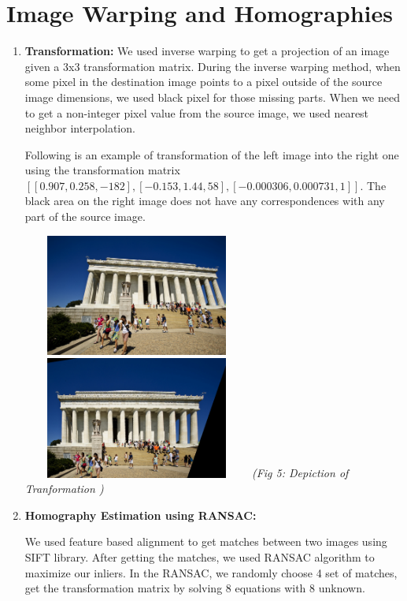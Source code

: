 \documentclass{article}
\begin{document}
			\part{ Image Warping and Homographies}	
			\begin{enumerate}
				\item  \textbf{Transformation:}
						We used inverse warping to get a projection of an image given a 3x3 transformation matrix. During the inverse warping method, when some pixel in the destination image points to a pixel outside of the source image dimensions, we used black pixel for those missing parts. When we need to get a non-integer pixel value from the source image, we used nearest neighbor interpolation. 
						
						Following is an example of transformation of the left image into the right one using the transformation matrix $[[0.907,0.258,-182],[-0.153,1.44,58],[-0.000306,0.000731,1]]$. The black area on the right image does not have any correspondences with any part of the source image.
						
								\begin{center}
									\includegraphics[height=4cm,width=7.5cm]{21} \includegraphics[height=4cm,width=7.5cm]{212} 
									\textit{	(Fig 5: Depiction of Tranformation )}
								\end{center}
								
					\item \textbf{Homography Estimation using RANSAC:}
					
					We used feature based alignment to get matches between two images using SIFT library. After getting the matches, we used RANSAC algorithm to maximize our inliers. In the RANSAC, we randomly choose 4 set of matches, get the transformation matrix by solving 8 equations with 8 unknown. 
					

\end{enumerate}
\end{document}
